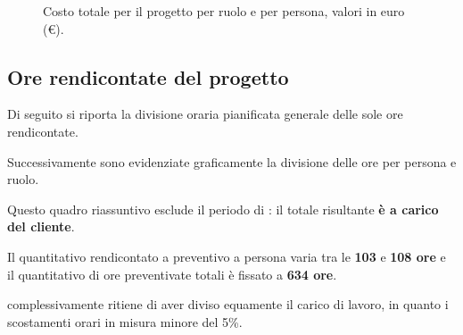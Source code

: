 \begin{figure}[H]
\label{tab:cgen1}

  \caption{Costo totale per il progetto {\proj} per ruolo e per persona, valori in euro (\euro).}
\end{figure}


\pagebreak[4]



\subsection{Ore rendicontate del progetto} 
\label{sec:orerend}
Di seguito si riporta la divisione oraria pianificata generale delle sole ore rendicontate.

Successivamente sono evidenziate graficamente la divisione delle ore per persona e ruolo.

Questo quadro riassuntivo esclude il periodo di {\AR}: il totale risultante \textbf{è a carico del cliente}.

Il quantitativo rendicontato a preventivo a persona varia tra le \textbf{103} e \textbf{108 ore} e il quantitativo di ore preventivate totali è fissato a \textbf{634 ore}.

{\hx} complessivamente ritiene di aver diviso equamente il carico di lavoro, in quanto i scostamenti orari in misura minore del 5\%.

